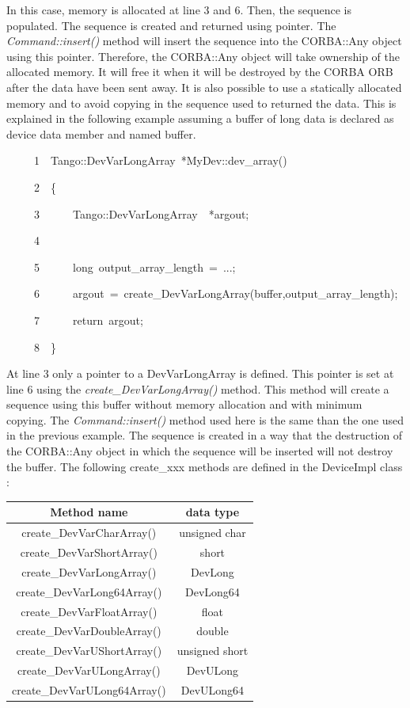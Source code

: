 In this case, memory is allocated at line 3 and 6. Then, the sequence
is populated. The sequence is created and returned using pointer.
The \emph{Command::insert()} method will insert the sequence into
the CORBA::Any object using this pointer. Therefore, the CORBA::Any
object will take ownership of the allocated memory. It will free it
when it will be destroyed by the CORBA ORB after the data have been
sent away. It is also possible to use a statically allocated memory
and to avoid copying in the sequence used to returned the data. This
is explained in the following example assuming a buffer of long data
is declared as device data member and named buffer.


\begin{lyxcode}
~~~~~1~~Tango::DevVarLongArray~{*}MyDev::dev\_array()

~~~~~2~~\{

~~~~~3~~~~~~Tango::DevVarLongArray~~{*}argout;

~~~~~4~~~~~~~~~~~~~~~~~~

~~~~~5~~~~~~long~output\_array\_length~=~...;

~~~~~6~~~~~~argout~=~create\_DevVarLongArray(buffer,output\_array\_length);

~~~~~7~~~~~~return~argout;

~~~~~8~~\}
\end{lyxcode}


At line 3 only a pointer to a DevVarLongArray is defined. This pointer
is set at line 6 using the \emph{create\_DevVarLongArray()}
method. This method will create a sequence using this buffer without
memory allocation and with minimum copying. The \emph{Command::insert()}
method used here is the same than the one used in the previous example.
The sequence is created in a way that the destruction of the CORBA::Any
object in which the sequence will be inserted will not destroy the
buffer. The following create\_xxx methods are defined in the DeviceImpl
class :

\vspace{0.3cm}


\begin{center}
\begin{longtable}{|c|c|}
\hline 
Method name & data type\tabularnewline
\hline 
\hline 
create\_DevVarCharArray() & unsigned char\tabularnewline
\hline 
create\_DevVarShortArray() & short\tabularnewline
\hline 
create\_DevVarLongArray() & DevLong\tabularnewline
\hline 
create\_DevVarLong64Array() & DevLong64\tabularnewline
\hline 
create\_DevVarFloatArray() & float\tabularnewline
\hline 
create\_DevVarDoubleArray() & double\tabularnewline
\hline 
create\_DevVarUShortArray() & unsigned short\tabularnewline
\hline 
create\_DevVarULongArray() & DevULong\tabularnewline
\hline 
create\_DevVarULong64Array() & DevULong64\tabularnewline
\hline 
\end{longtable}
\par\end{center}

